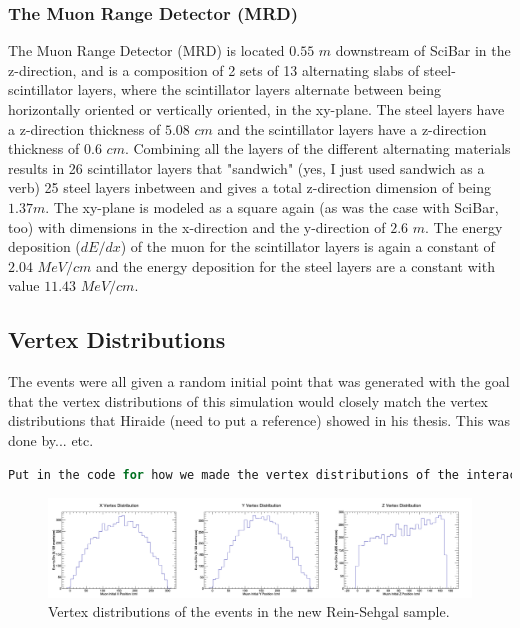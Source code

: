 \documentclass[11pt]{article}
\begin{document}
\subsubsection{The Muon Range Detector (MRD)}
The Muon Range Detector (MRD) is located $0.55$ $m$ downstream of SciBar in the z-direction, and is a composition of 2 sets of 13 alternating slabs of steel-scintillator layers, where the scintillator layers alternate between being horizontally oriented or vertically oriented, in the xy-plane. The steel layers have a z-direction thickness of $5.08$ $cm$ and the scintillator layers have a z-direction thickness of $0.6$ $cm$. Combining all the layers of the different alternating materials results in 26 scintillator layers that "sandwich" (yes, I just used sandwich as a verb) 25 steel layers inbetween and gives a total z-direction dimension of being $1.37 m$. The xy-plane is modeled as a square again (as was the case with SciBar, too) with dimensions in the x-direction and the y-direction of $2.6$ $m$. The energy deposition ($dE/dx$) of the muon for the scintillator layers is again a constant of $2.04$ $MeV/cm$ and the energy deposition for the steel layers are a constant with value $11.43$ $MeV/cm$.

\subsection{Vertex Distributions}
The events were all given a random initial point that was generated with the goal that the vertex distributions of this simulation would closely match the vertex distributions that Hiraide (need to put a reference) showed in his thesis. This was done by... etc.

\begin{lstlisting}[language=C]
Put in the code for how we made the vertex distributions of the interactions.
\end{lstlisting}

\begin{figure}[H]
\centering
\includegraphics[width=1.0\textwidth]{EventClassifications/VertexDistributions.png}
\caption{Vertex distributions of the events in the new Rein-Sehgal sample.}
\end{figure}
\end{document}

